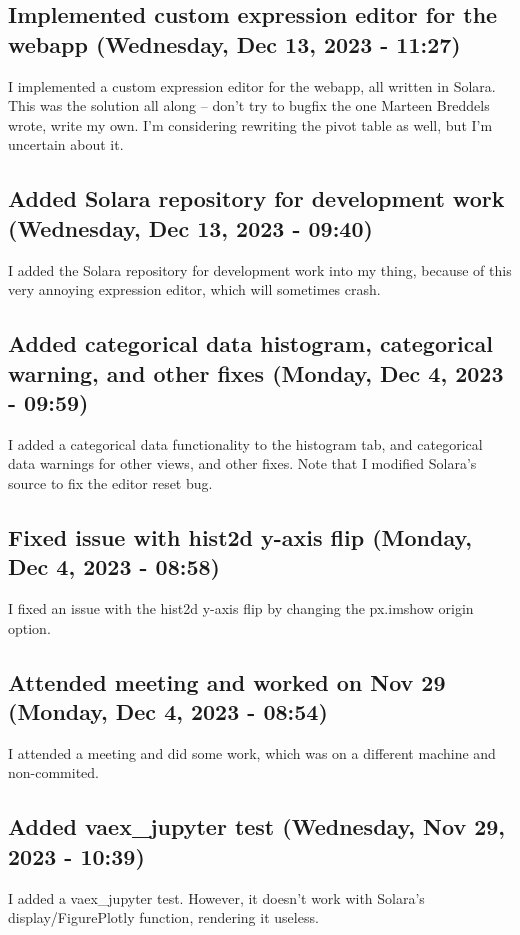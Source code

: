 \documentclass[a4paper]{article}
\begin{document}
\subsection*{Implemented custom expression editor for the webapp (Wednesday, Dec 13, 2023 - 11:27)}
I implemented a custom expression editor for the webapp, all written in Solara. This was the solution all along -- don't try to bugfix the one Marteen Breddels wrote, write my own. I'm considering rewriting the pivot table as well, but I'm uncertain about it.

\subsection*{Added Solara repository for development work (Wednesday, Dec 13, 2023 - 09:40)}
I added the Solara repository for development work into my thing, because of this very annoying expression editor, which will sometimes crash.

\subsection*{Added categorical data histogram, categorical warning, and other fixes (Monday, Dec 4, 2023 - 09:59)}
I added a categorical data functionality to the histogram tab, and categorical data warnings for other views, and other fixes. Note that I modified Solara's source to fix the editor reset bug.

\subsection*{Fixed issue with hist2d y-axis flip (Monday, Dec 4, 2023 - 08:58)}
I fixed an issue with the hist2d y-axis flip by changing the px.imshow origin option.

\subsection*{Attended meeting and worked on Nov 29 (Monday, Dec 4, 2023 - 08:54)}
I attended a meeting and did some work, which was on a different machine and non-commited.

\subsection*{Added vaex\_jupyter test (Wednesday, Nov 29, 2023 - 10:39)}
I added a vaex\_jupyter test. However, it doesn't work with Solara's display/FigurePlotly function, rendering it useless.
\end{document}
